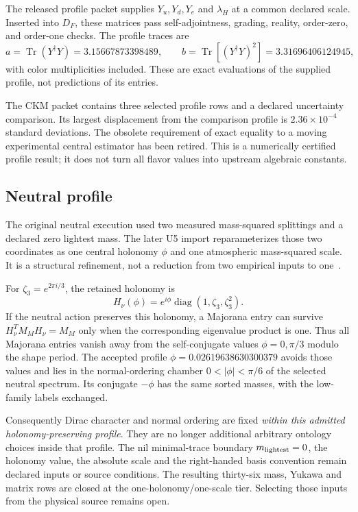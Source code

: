 \documentclass[11pt]{article}
\newcommand{\Tr}{\operatorname{Tr}}
\begin{document}
The released profile packet supplies $Y_u,Y_d,Y_e$ and $\lambda_H$ at a common declared scale.
Inserted into $D_F$, these matrices pass self-adjointness, grading, reality, order-zero, and
order-one checks.  The profile traces are
\begin{equation}
a=\Tr(Y^\dagger Y)=3.15667873398489,
\qquad
b=\Tr[(Y^\dagger Y)^2]=3.31696406124945,
\end{equation}
with color multiplicities included.  These are exact evaluations of the supplied profile, not
predictions of its entries.

The CKM packet contains three selected profile rows and a declared uncertainty comparison.  Its
largest displacement from the comparison profile is $2.36\times10^{-4}$ standard deviations.
The obsolete requirement of exact equality to a moving experimental central estimator has been
retired.  This is a numerically certified profile result; it does not turn all flavor values into
upstream algebraic constants.

\subsection{Neutral profile}

The original neutral execution used two measured mass-squared splittings and a declared
zero lightest mass.  The later U5 import reparameterizes those two coordinates as one
central holonomy $\phi$ and one atmospheric mass-squared scale.  It is a structural refinement,
not a reduction from two empirical inputs to one~\cite{SMNeutralBranch}.

For $\zeta_3=e^{2\pi i/3}$, the retained holonomy is
\begin{equation}
H_\nu(\phi)=e^{i\phi}\operatorname{diag}(1,\zeta_3,\zeta_3^2).
\end{equation}
If the neutral action preserves this holonomy, a Majorana entry can survive
$H_\nu^T M_MH_\nu=M_M$ only when the corresponding eigenvalue product is one.
Thus all Majorana entries vanish away from the self-conjugate values
$\phi=0,\pi/3$ modulo the shape period.  The accepted profile
$\phi=0.02619638630300379$ avoids those values and lies in the normal-ordering chamber
$0<|\phi|<\pi/6$ of the selected neutral spectrum.  Its conjugate $-\phi$ has the same
sorted masses, with the low-family labels exchanged.

Consequently Dirac character and normal ordering are fixed \emph{within this admitted
holonomy-preserving profile}.  They are no longer additional arbitrary ontology choices
inside that profile.  The nil minimal-trace boundary $m_{\rm lightest}=0$, the holonomy value,
the absolute scale and the right-handed basis convention remain declared inputs or source
conditions.  The resulting thirty-six mass, Yukawa and matrix rows are closed at the
one-holonomy/one-scale tier.  Selecting those inputs from the physical source remains open.
\end{document}
